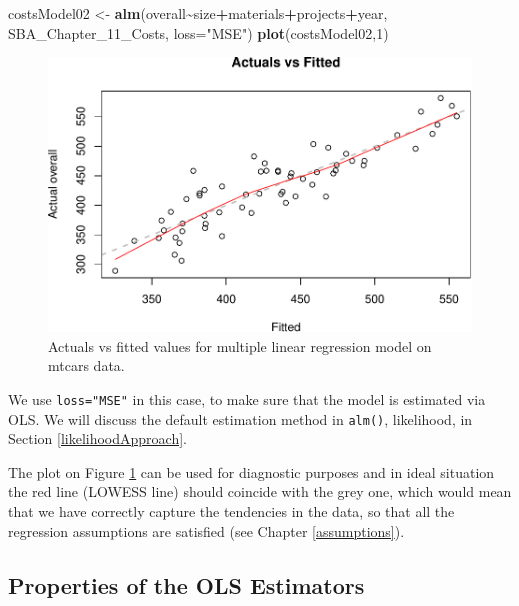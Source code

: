 \documentclass[
]{book}
\newenvironment{Shaded}{\begin{snugshade}}{\end{snugshade}}
\newcommand{\AttributeTok}[1]{\textcolor[rgb]{0.13,0.29,0.53}{#1}}
\newcommand{\DecValTok}[1]{\textcolor[rgb]{0.00,0.00,0.81}{#1}}
\newcommand{\FunctionTok}[1]{\textcolor[rgb]{0.13,0.29,0.53}{\textbf{#1}}}
\newcommand{\NormalTok}[1]{#1}
\newcommand{\OtherTok}[1]{\textcolor[rgb]{0.56,0.35,0.01}{#1}}
\newcommand{\SpecialCharTok}[1]{\textcolor[rgb]{0.81,0.36,0.00}{\textbf{#1}}}
\newcommand{\StringTok}[1]{\textcolor[rgb]{0.31,0.60,0.02}{#1}}
\theoremstyle{definition}
\theoremstyle{definition}
\theoremstyle{definition}
\theoremstyle{definition}
\theoremstyle{remark}
\begin{document}
\begin{Shaded}
\begin{Highlighting}[]
\NormalTok{costsModel02 }\OtherTok{\textless{}{-}} \FunctionTok{alm}\NormalTok{(overall}\SpecialCharTok{\textasciitilde{}}\NormalTok{size}\SpecialCharTok{+}\NormalTok{materials}\SpecialCharTok{+}\NormalTok{projects}\SpecialCharTok{+}\NormalTok{year, SBA\_Chapter\_11\_Costs, }\AttributeTok{loss=}\StringTok{"MSE"}\NormalTok{)}
\FunctionTok{plot}\NormalTok{(costsModel02,}\DecValTok{1}\NormalTok{)}
\end{Highlighting}
\end{Shaded}

\begin{figure}
\centering
\includegraphics{Svetunkov---Statistics-for-Business-Analytics_files/figure-latex/costsModel02Plot-1.pdf}
\caption{\label{fig:costsModel02Plot}Actuals vs fitted values for multiple linear regression model on mtcars data.}
\end{figure}

We use \texttt{loss="MSE"} in this case, to make sure that the model is estimated via OLS. We will discuss the default estimation method in \texttt{alm()}, likelihood, in Section \ref{likelihoodApproach}.

The plot on Figure \ref{fig:costsModel02Plot} can be used for diagnostic purposes and in ideal situation the red line (LOWESS line) should coincide with the grey one, which would mean that we have correctly capture the tendencies in the data, so that all the regression assumptions are satisfied (see Chapter \ref{assumptions}).

\subsection{Properties of the OLS Estimators}\label{properties-of-the-ols-estimators}
\end{document}
